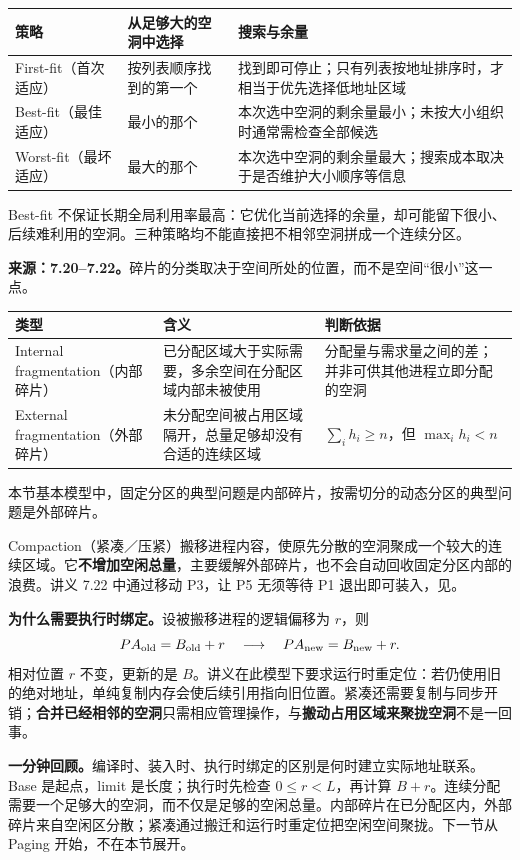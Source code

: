 \begin{center}
\begin{tabularx}{\textwidth}{@{}>{\raggedright\arraybackslash}p{3.0cm}>{\raggedright\arraybackslash}X>{\raggedright\arraybackslash}X@{}}
\toprule
策略 & 从足够大的空洞中选择 & 搜索与余量 \\
\midrule
First-fit（首次适应） & 按列表顺序找到的第一个 & 找到即可停止；只有列表按地址排序时，才相当于优先选择低地址区域 \\
Best-fit（最佳适应） & 最小的那个 & 本次选中空洞的剩余量最小；未按大小组织时通常需检查全部候选 \\
Worst-fit（最坏适应） & 最大的那个 & 本次选中空洞的剩余量最大；搜索成本取决于是否维护大小顺序等信息 \\
\bottomrule
\end{tabularx}
\end{center}
Best-fit 不保证长期全局利用率最高：它优化当前选择的余量，却可能留下很小、后续难利用的空洞。三种策略均不能直接把不相邻空洞拼成一个连续分区。


\textbf{来源：7.20--7.22。}碎片的分类取决于空间所处的位置，而不是空间“很小”这一点。

\begin{center}
\begin{tabularx}{\textwidth}{@{}>{\raggedright\arraybackslash}p{3.8cm}>{\raggedright\arraybackslash}X>{\raggedright\arraybackslash}X@{}}
\toprule
类型 & 含义 & 判断依据 \\
\midrule
Internal fragmentation（内部碎片） & 已分配区域大于实际需要，多余空间在分配区域内部未被使用 & 分配量与需求量之间的差；并非可供其他进程立即分配的空洞 \\
External fragmentation（外部碎片） & 未分配空间被占用区域隔开，总量足够却没有合适的连续区域 & $\sum_i h_i\ge n$，但 $\max_i h_i<n$ \\
\bottomrule
\end{tabularx}
\end{center}
本节基本模型中，固定分区的典型问题是内部碎片，按需切分的动态分区的典型问题是外部碎片。

Compaction（紧凑／压紧）搬移进程内容，使原先分散的空洞聚成一个较大的连续区域。它\textbf{不增加空闲总量}，主要缓解外部碎片，也不会自动回收固定分区内部的浪费。讲义 7.22 中通过移动 P3，让 P5 无须等待 P1 退出即可装入，见。

\textbf{为什么需要执行时绑定。}设被搬移进程的逻辑偏移为 $r$，则
\[
 PA_{\rm old}=B_{\rm old}+r
 \quad\longrightarrow\quad
 PA_{\rm new}=B_{\rm new}+r.
\]
相对位置 $r$ 不变，更新的是 $B$。讲义在此模型下要求运行时重定位：若仍使用旧的绝对地址，单纯复制内存会使后续引用指向旧位置。紧凑还需要复制与同步开销；\textbf{合并已经相邻的空洞}只需相应管理操作，与\textbf{搬动占用区域来聚拢空洞}不是一回事。

\textbf{一分钟回顾。}编译时、装入时、执行时绑定的区别是何时建立实际地址联系。Base 是起点，limit 是长度；执行时先检查 $0\le r<L$，再计算 $B+r$。连续分配需要一个足够大的空洞，而不仅是足够的空闲总量。内部碎片在已分配区内，外部碎片来自空闲区分散；紧凑通过搬迁和运行时重定位把空闲空间聚拢。下一节从 Paging 开始，不在本节展开。

